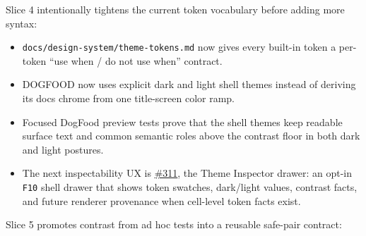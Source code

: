 Slice 4 intentionally tightens the current token vocabulary before adding more syntax:

\begin{itemize}
\tightlist
\item
  \texttt{d\allowbreak{}o\allowbreak{}c\allowbreak{}s\allowbreak{}/\allowbreak{}d\allowbreak{}e\allowbreak{}s\allowbreak{}i\allowbreak{}g\allowbreak{}n\allowbreak{}-\allowbreak{}s\allowbreak{}y\allowbreak{}s\allowbreak{}t\allowbreak{}e\allowbreak{}m\allowbreak{}/\allowbreak{}t\allowbreak{}h\allowbreak{}e\allowbreak{}m\allowbreak{}e\allowbreak{}-\allowbreak{}t\allowbreak{}o\allowbreak{}k\allowbreak{}e\allowbreak{}n\allowbreak{}s\allowbreak{}.\allowbreak{}m\allowbreak{}d} now gives every built-in token a per-token ``use when / do not use when'' contract.
\item
  DOGFOOD now uses explicit dark and light shell themes instead of deriving its docs chrome from one title-screen color ramp.
\item
  Focused DogFood preview tests prove that the shell themes keep readable surface text and common semantic roles above the contrast floor in both dark and light postures.
\item
  The next inspectability UX is \href{https://github.com/flyingrobots/bijou/issues/311}{\#311}, the Theme Inspector drawer: an opt-in \texttt{F\allowbreak{}1\allowbreak{}0} shell drawer that shows token swatches, dark/light values, contrast facts, and future renderer provenance when cell-level token facts exist.
\end{itemize}

Slice 5 promotes contrast from ad hoc tests into a reusable safe-pair contract:

